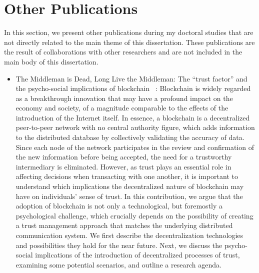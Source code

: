 \section{Other Publications}
In this section, we present other publications during my doctoral studies that are not directly related to the main theme of this dissertation. These publications are the result of collaborations with other researchers and are not included in the main body of this dissertation.

\begin{itemize}

    \item{The Middleman is Dead, Long Live the Middleman: The “trust factor” and the psycho-social implications of blockchain ~\cite{gaggioli2019middleman}}: Blockchain is widely regarded as a breakthrough innovation that may have a profound impact on the economy and society, of a magnitude comparable to the effects of the introduction of the Internet itself. In essence, a blockchain is a decentralized peer-to-peer network with no central authority figure, which adds information to the distributed database by collectively validating the accuracy of data. Since each node of the network participates in the review and confirmation of the new information before being accepted, the need for a trustworthy intermediary is eliminated. However, as trust plays an essential role in affecting decisions when transacting with one another, it is important to understand which implications the decentralized nature of blockchain may have on individuals' sense of trust. In this contribution, we argue that the adoption of blockchain is not only a technological, but foremostly a psychological challenge, which crucially depends on the possibility of creating a trust management approach that matches the underlying distributed communication system. We first describe the decentralization technologies and possibilities they hold for the near future. Next, we discuss the psycho-social implications of the introduction of decentralized processes of trust, examining some potential scenarios, and outline a research agenda.


\end{itemize}
